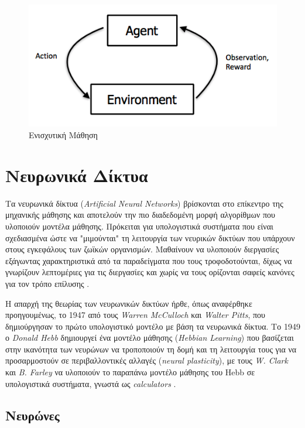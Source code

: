\medskip
\begin{figure}[h]
  \centering
  \includegraphics[scale=0.78]{images/reinflearn.png}
  \caption{Ενισχυτική Μάθηση}
  \label{fig:reinflearn}
\end{figure}

\newpage
\section{Νευρωνικά Δίκτυα}

Τα νευρωνικά δίκτυα (\textit{Artificial Neural Networks}) βρίσκονται στο επίκεντρο της μηχανικής μάθησης και αποτελούν την πιο διαδεδομένη μορφή αλγορίθμων που υλοποιούν μοντέλα μάθησης. Πρόκειται για υπολογιστικά συστήματα που είναι σχεδιασμένα ώστε να "μιμούνται" τη λειτουργία των νευρικών δικτύων που υπάρχουν στους εγκεφάλους των ζωϊκών οργανισμών. Μαθαίνουν να υλοποιούν διεργασίες εξάγωντας χαρακτηριστικά από τα παραδείγματα που τους τροφοδοτούνται, δίχως να γνωρίζουν λεπτομέριες για τις διεργασίες και χωρίς να τους ορίζονται σαφείς κανόνες για τον τρόπο επίλυσης \cite{Chen2019}.

\medskip
Η απαρχή της θεωρίας των νευρωνικών δικτύων ήρθε, όπως αναφέρθηκε προηγουμένως, το 1947 από τους \textit{Warren McCulloch} και \textit{Walter Pitts}, που δημιούργησαν το πρώτο υπολογιστικό μοντέλο με βάση τα νευρωνικά δίκτυα. Το 1949 ο \textit{Donald Hebb} δημιουργεί ένα μοντέλο μάθησης (\textit{Hebbian Learning}) που βασίζεται στην ικανότητα των νευρώνων να τροποποιούν τη δομή και τη λειτουργία τους για να προσαρμοστούν σε περιβαλλοντικές αλλαγές (\textit{neural plasticity}), με τους \textit{W. Clark} και \textit{B. Farley} να υλοποιούν το παραπάνω μοντέλο μάθησης του Hebb σε υπολογιστικά συστήματα, γνωστά ως \textit{calculators} \cite{Farley1954}.

\subsection{Νευρώνες}

